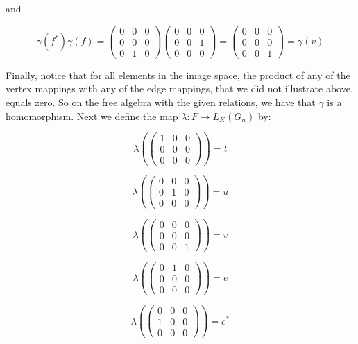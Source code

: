 \begin{solution}
    and

    $$\gamma(f^*)\gamma(f)=
    \left(\begin{array}{ccc} 0 & 0 & 0 \\ 0 & 0 & 0 \\ 0 & 1 & 0 \end{array}\right)
    \left(\begin{array}{ccc} 0 & 0 & 0 \\ 0 & 0 & 1 \\ 0 & 0 & 0 \end{array}\right)
    =\left(\begin{array}{ccc} 0 & 0 & 0 \\ 0 & 0 & 0 \\ 0 & 0 & 1 \end{array}\right)=\gamma(v)$$

    Finally, notice that for all elements in the image space, the product of any of the vertex mappings
    with any of the edge mappings, that we did not illustrate above, equals zero. So on the free algebra
    with the given relations, we have that $\gamma$ is a homomorphism.
    Next we define the map $\lambda:F\to L_K(G_n)$ by:

    $$\lambda(\left(\begin{array}{ccc} 1 & 0 & 0 \\ 0 & 0 & 0 \\ 0 & 0 & 0 \end{array}\right))=t$$

    $$\lambda(\left(\begin{array}{ccc} 0 & 0 & 0 \\ 0 & 1 & 0 \\ 0 & 0 & 0 \end{array}\right))=u$$

    $$\lambda(\left(\begin{array}{ccc} 0 & 0 & 0 \\ 0 & 0 & 0 \\ 0 & 0 & 1 \end{array}\right))=v$$

    $$\lambda(\left(\begin{array}{ccc} 0 & 1 & 0 \\ 0 & 0 & 0 \\ 0 & 0 & 0 \end{array}\right))=e$$

    $$\lambda(\left(\begin{array}{ccc} 0 & 0 & 0 \\ 1 & 0 & 0 \\ 0 & 0 & 0 \end{array}\right))=e^*$$


\end{solution}
